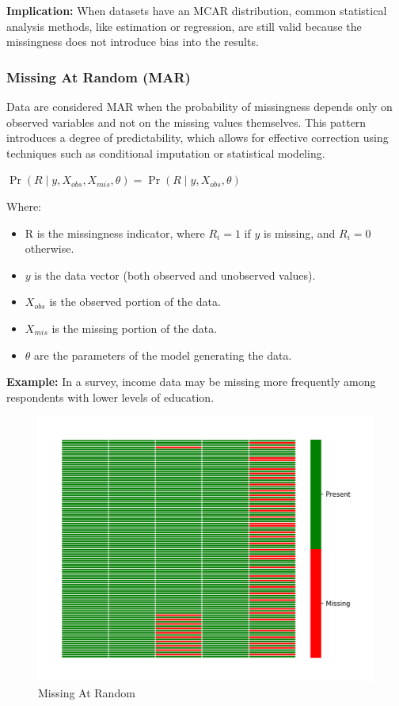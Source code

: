 \documentclass[a4paper,12pt]{article}
\begin{document}
\textbf{Implication:} When datasets have an MCAR distribution, common statistical analysis methods, like estimation or regression, are still valid because the missingness does not introduce bias into the results. ~\cite{34}

\subsubsection{Missing At Random (MAR)}

Data are considered MAR when the probability of missingness depends only on observed variables and not on the missing values themselves. This pattern introduces a degree of predictability, which allows for effective correction using techniques such as conditional imputation or statistical modeling. ~\cite{24}

\begin{center}
$\Pr(R \mid y, X_{obs}, X_{mis}, \theta) = \Pr(R \mid y, X_{obs}, \theta)$
\end{center}

Where:
\begin{itemize}
\item R is the missingness indicator, where \( R_i = 1 \) if $y$ is missing, and \( R_i = 0 \) otherwise.
\item $y$ is the data vector (both observed and unobserved values).
\item $X_{obs}$ is the observed portion of the data.
\item $X_{mis}$ is the missing portion of the data.
\item $\theta$ are the parameters of the model generating the data.
\end{itemize}

\textbf{Example:} In a survey, income data may be missing more frequently among respondents with lower levels of education.

\begin{figure}[H]
\centering
\includegraphics[width=0.5\linewidth]{MAR_heatmap.png}
\caption{Missing At Random}
\end{figure}
\end{document}
